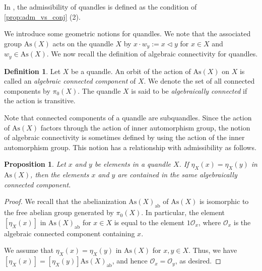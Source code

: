\documentclass[dvipdfmx,12pt]{amsart}
\theoremstyle{plain}
\newtheorem{prop}[thm]{Proposition}
\theoremstyle{definition}
\newtheorem{dfn}[thm]{Definition}
\newcommand{\As}{\mathrm{As}}
\newcommand{\ab}{\mathrm{ab}}
\newcommand{\qop}{\triangleleft}
\newcommand{\Conj}{\mathrm{Conj}}
\newcommand{\Inn}{\mathrm{Inn}}
\newcommand{\OO}{\mathcal{O}}
\begin{document}
In \cite{Kamada-2005-EnvelopingMonoidalQuandlesa}, the admissibility of quandles is defined as the condition of \cref{prop:adm_vs_conj} (2).


We introduce some geometric notions for quandles.
We note that the associated group $\As(X)$ acts on the quandle $X$ by $x \cdot w_y := x \qop y$ for $x \in X$ and $w_y \in \As(X)$.
We now recall the definition of algebraic connectivity for quandles.

\begin{dfn}\label{def:AlgConn}
  Let $X$ be a quandle.
  An orbit of the action of $\As(X)$ on $X$ is called an \emph{algebraic connected component} of $X$.
  We denote the set of all connected components by $\pi_0(X)$.
  The quandle $X$ is said to be \emph{algebraically connected} if the action is transitive.
\end{dfn}
Note that connected components of a quandle are subquandles. 
Since the action of $\As(X)$ factors through the action of inner automorphism group, the notion of algebraic connectivity is sometimes defined by using the action of the inner automorphism group.
This notion has a relationship with admissibility as follows.

\begin{prop}\label{prop:AlgConn_vs_Adm}
  Let $x$ and $y$ be elements in  a quandle $X$.
  If $\eta_X(x) = \eta_X(y)$ in $\As(X)$, 
  then the elements $x$ and $y$ are contained in the same algebraically connected component.
\end{prop}
\begin{proof}
  We recall that the abelianization $\As(X)_{\ab}$ of $\As(X)$ is isomorphic to the free abelian group generated by $\pi_0(X)$.
  In particular, the element $[\eta_X(x)]$ in $\As(X)_{\ab}$ for $x \in X$ is equal to the element $1 \mathcal{O}_x$, where $\mathcal{O}_x$ is the algebraic connected component containing $x$.
  
  We assume that $\eta_X(x) = \eta_X(y)$ in $\As(X)$ for $x, y \in X$.
  Thus, we have $[\eta_X(x)] = [\eta_X(y)] \As(X)_{\ab}$,
  and hence $\OO_x = \OO_y$, as desired.
\end{proof}
\end{document}
